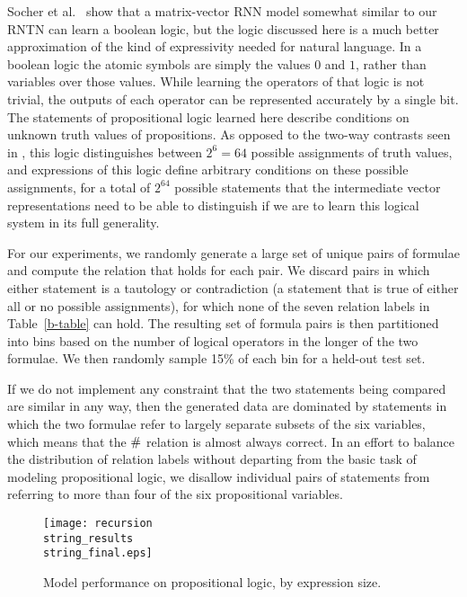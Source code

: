 Socher et al.~ show that a matrix-vector RNN
model somewhat similar to our RNTN can learn a boolean logic, but the logic
discussed here is a much better approximation of the kind of
expressivity needed for natural language. In a boolean logic
 the atomic symbols are simply the
values $0$ and $1$, rather than variables over those values. While
learning the operators of that logic is not trivial, the outputs of
each operator can be represented accurately by a single bit. The
statements of propositional logic learned here describe conditions on
unknown truth values of propositions. As opposed to the two-way
contrasts seen in , this logic distinguishes
between $2^{6} = 64$ possible assignments of truth values, and
expressions of this logic define arbitrary conditions on these
possible assignments, for a total of $2^{64}$ %
possible statements that the intermediate vector representations need
to be able to distinguish if we are to learn this logical system in its
full generality.

For our experiments, we randomly generate a large set of  unique pairs 
of formulae and compute the relation that holds for each pair.
We discard pairs in which either statement is a tautology or
contradiction (a statement that is true of either all or no possible
assignments), for which none of the seven relation labels in
Table~\ref{b-table} can hold. The resulting set of formula pairs is
then partitioned into bins based on the number of logical operators in
the longer of the two formulae. We then randomly sample 15\% of each
bin for a held-out test set.

If we do not implement any constraint that the two statements being
compared are similar in any way, then the generated data are dominated
by statements in which the two formulae refer to largely separate
subsets of the six variables, which means that the $\mathbin{\#}$ relation
is almost always correct.  In an effort to balance the distribution of
relation labels without departing from the basic task of modeling
propositional logic, we disallow individual pairs of statements from
referring to more than four of the six propositional variables.

\begin{figure*}[t]
  \centering
  \texttt{[image: recursion\\string\_results\\string\_final.eps]}
  \caption{Model performance on propositional logic, by expression size. 
    }  
  \label{prop-results}
\end{figure*}

